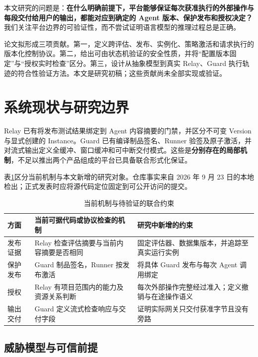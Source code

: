 \documentclass[11pt,a4paper]{article}
\theoremstyle{definition}
\begin{document}
本文研究的问题是：\textbf{在什么明确前提下，平台能够保证每次获准执行的外部操作与每段交付给用户的输出，都能对应到确定的 Agent 版本、保护发布和授权决定？} 我们关注平台边界的可验证性，而不尝试证明语言模型的推理过程总是正确。

论文拟形成三项贡献。第一，定义跨评估、发布、实例化、策略激活和请求执行的版本化控制协议。第二，给出可由状态机验证的安全性质，并将“配置版本固定”与“授权实时检查”区分。第三，设计从抽象模型到真实 Relay、Guard 执行轨迹的符合性验证方法。本文是研究初稿；这些贡献尚未全部实现或验证。

\section{系统现状与研究边界}

Relay 已有将发布测试结果绑定到 Agent 内容摘要的门禁，并区分不可变 Version 与显式创建的 Instance\cite{relayrepo}。Guard 已有编译制品签名、Runner 验签及原子激活，并对流式输出定义全缓冲、窗口缓冲和可中断交付模式\cite{guardrepo}。这些是\textbf{分别存在的局部机制}，不足以推出两个产品组成的平台已具备联合形式化保证。

表\ref{tab:status}区分当前机制与本文新增的研究对象。仓库事实来自 2026 年 9 月 23 日的本地检出；正式发表时应将源代码定位固定到可公开访问的提交。

\begin{table}[htbp]
\centering
\small
\caption{当前机制与待验证的联合约束}\label{tab:status}
\begin{tabularx}{\textwidth}{>{\raggedright\arraybackslash}p{31mm} >{\raggedright\arraybackslash}X >{\raggedright\arraybackslash}X}
\toprule
方面 & 当前可据代码或协议检查的机制 & 研究中新增的约束 \\
\midrule
发布证据 & Relay 检查评估摘要与当前内容摘要是否相同 & 固定评估器、数据集版本，并追踪至真实运行实例 \\
保护发布 & Guard 制品签名，Runner 按发布激活 & 将具体 Guard 发布与每次 Agent 调用绑定 \\
授权 & Relay 有项目范围内的能力及资源关系判断 & 每次外部操作完整经过准入；定义撤销与在途操作语义 \\
输出交付 & Guard 定义流式检查响应与交付字段 & 证明实际网关只交付获准字节且没有旁路 \\
\bottomrule
\end{tabularx}
\end{table}

\subsection{威胁模型与可信前提}
\end{document}
